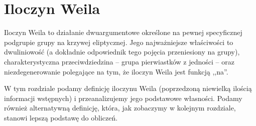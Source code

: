 \chapter{Iloczyn Weila}

\noindent
Iloczyn Weila to działanie dwuargumentowe
określone na pewnej specyficznej podgrupie grupy na krzywej eliptycznej.
Jego najważniejsze właściwości to dwuliniowość
(a dokładnie odpowiednik tego pojęcia przeniesiony na grupy),
charakterystyczna przeciwdziedzina
-- grupa pierwiastków z jedności --
oraz niezdegenerowanie polegające na tym,
że iloczyn Weila jest funkcją ,,na''.

\noindent
W tym rozdziale podamy definicję iloczynu Weila
(poprzedzoną niewielką ilością informacji wstępnych)
i przeanalizujemy jego podstawowe własności.
Podamy również alternatywną definicję, która,
jak zobaczymy w kolejnym rozdziale,
stanowi lepszą podstawę do obliczeń.






